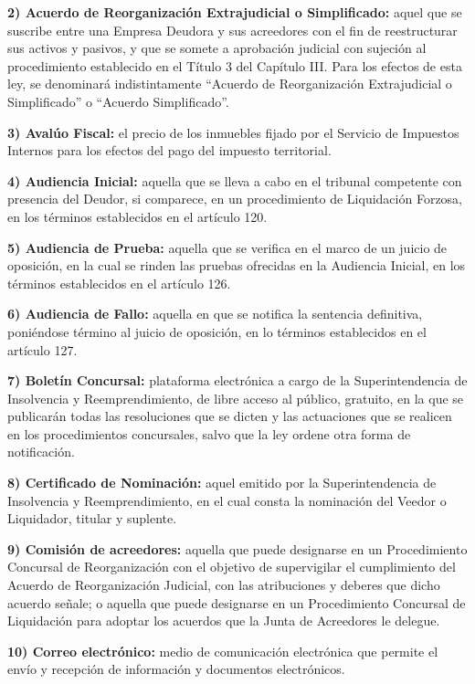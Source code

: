 \documentclass[
]{book}
\begin{document}
\textbf{2) Acuerdo de Reorganización Extrajudicial o Simplificado:} aquel que se suscribe entre una Empresa Deudora y sus acreedores con el fin de reestructurar sus activos y pasivos, y que se somete a aprobación judicial con sujeción al procedimiento establecido en el Título 3 del Capítulo III. Para los efectos de esta ley, se denominará indistintamente ``Acuerdo de Reorganización Extrajudicial o Simplificado'' o ``Acuerdo Simplificado''.

\textbf{3) Avalúo Fiscal:} el precio de los inmuebles fijado por el Servicio de Impuestos Internos para los efectos del pago del impuesto territorial.

\textbf{4) Audiencia Inicial:} aquella que se lleva a cabo en el tribunal competente con presencia del Deudor, si comparece, en un procedimiento de Liquidación Forzosa, en los términos establecidos en el artículo 120.

\textbf{5) Audiencia de Prueba:} aquella que se verifica en el marco de un juicio de oposición, en la cual se rinden las pruebas ofrecidas en la Audiencia Inicial, en los términos establecidos en el artículo 126.

\textbf{6) Audiencia de Fallo:} aquella en que se notifica la sentencia definitiva, poniéndose término al juicio de oposición, en lo términos establecidos en el artículo 127.

\textbf{7) Boletín Concursal:} plataforma electrónica a cargo de la Superintendencia de Insolvencia y Reemprendimiento, de libre acceso al público, gratuito, en la que se publicarán todas las resoluciones que se dicten y las actuaciones que se realicen en los procedimientos concursales, salvo que la ley ordene otra forma de notificación.

\textbf{8) Certificado de Nominación:} aquel emitido por la Superintendencia de Insolvencia y Reemprendimiento, en el cual consta la nominación del Veedor o Liquidador, titular y suplente.

\textbf{9) Comisión de acreedores:} aquella que puede designarse en un Procedimiento Concursal de Reorganización con el objetivo de supervigilar el cumplimiento del Acuerdo de Reorganización Judicial, con las atribuciones y deberes que dicho acuerdo señale; o aquella que puede designarse en un Procedimiento Concursal de Liquidación para adoptar los acuerdos que la Junta de Acreedores le delegue.

\textbf{10) Correo electrónico:} medio de comunicación electrónica que permite el envío y recepción de información y documentos electrónicos.
\end{document}
